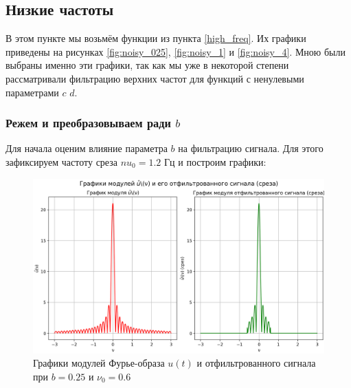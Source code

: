 \subsection{Низкие частоты}

В этом пункте мы возьмём функции из пункта \ref{high_freq}. Их графики приведены на рисунках \ref{fig:noisy_025}, \ref{fig:noisy_1} и \ref{fig:noisy_4}. Мною были выбраны именно эти графики, так как мы уже в некоторой степени рассматривали фильтрацию верхних частот для функций с ненулевыми параметрами $c$ $d$.

\subsubsection{Режем и преобразовываем ради $b$}
Для начала оценим влияние параметра $b$ на фильтрацию сигнала. Для этого зафиксируем частоту среза $nu_0=1.2$ Гц и построим графики:

\begin{figure}[ht!]
    \centering
    \includegraphics[scale=0.55]{media/1 task/high_freq/Fourier_Image_0,25_-0,5975975975975976.png}
    \caption{Графики модулей Фурье-образа $u(t)$ и отфильтрованного сигнала при $b=0.25$ и $\nu_0=0.6$}
    \label{fig:four_025_06}
\end{figure}

